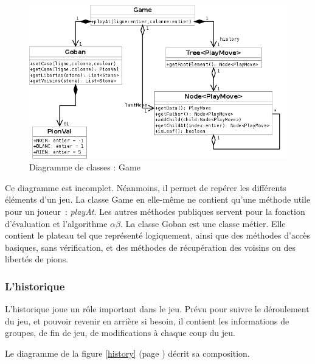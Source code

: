 \documentclass[11pt,a4paper,titlepage,french]{article}
\begin{document}
				\begin{figure}[hbt]
					\begin{center}
						\includegraphics[width=1.1\textwidth]{./classes.png}
					\end{center}
					\caption{Diagramme de classes : Game}
					\label{classes}
				\end{figure}

			Ce diagramme est incomplet. Néanmoins, il permet de repérer les différents éléments d'un jeu. La classe Game en elle-même ne contient qu'une méthode utile pour un joueur~: \emph{playAt}. Les autres méthodes publiques servent pour la fonction d'évaluation et l'algorithme $\alpha\beta$. La classe Goban est une classe métier. Elle contient le plateau tel que représenté logiquement, ainsi que des méthodes d'accès basiques, sans vérification, et des méthodes de récupération des voisins ou des libertés de pions.


			\subsubsection{L'historique}

				L'historique joue un rôle important dans le jeu. Prévu pour suivre le déroulement du jeu, et pouvoir revenir en arrière si besoin, il contient les informations de groupes, de fin de jeu, de modifications à chaque coup du jeu.

				Le diagramme de la figure \ref{history} (page \pageref{history}) décrit sa composition.
\end{document}
